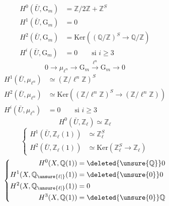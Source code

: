 \[
\begin{aligned}
H^0(\bar U,\mathrm{G}_m)&=\mathbb{Z}/2\mathbb{Z}+\mathbb{Z}^S\\
H^1(\bar U,\mathrm{G}_m)&=0\\
H^2(\bar U,\mathrm{G}_m)&=\mathrm{Ker}\left((\mathbb{Q}/\mathbb{Z})^S\longrightarrow\mathbb{Q}/\mathbb{Z}\right)\\
H^i(\bar U,\mathrm{G}_m)&=0\qquad\text{si }i\geq3
\end{aligned}
\]
\[
0\to\mu_{\ell^n}\to\mathrm{G}_m\xrightarrow{\ell^n}\mathrm{G}_m\to0
\]
\[
\begin{aligned}
H^1(\bar U,\mu_{\ell^n})&\simeq(\mathbb{Z}/\ell^n\mathbb{Z})^S\\
H^2(\bar U,\mu_{\ell^n})&\simeq\mathrm{Ker}\left((\mathbb{Z}/\ell^n\mathbb{Z})^S\longrightarrow(\mathbb{Z}/\ell^n\mathbb{Z})\right)\\
H^i(\bar U,\mu_{\ell^n})&=0\qquad\text{si }i\geq3
\end{aligned}
\]
\[
H^0(\bar U,\mathbb{Z}_\ell)\simeq\mathbb{Z}_\ell
\]
\[
\left\{\begin{aligned}
H^1(\bar U,\mathbb{Z}_\ell(1))&\simeq\mathbb{Z}_\ell^S\\
H^2(\bar U,\mathbb{Z}_\ell(1))&\simeq\mathrm{Ker}\left(\mathbb{Z}_\ell^S\longrightarrow\mathbb{Z}_\ell\right)
\end{aligned}\right.
\]
\[
\left\{\begin{aligned}
H^0(X,\mathbb{Q}(1))&=\deleted{\unsure{\mathbb{Q}}}0\\
H^1(X,\mathbb{Q}_{\unsure{\ell|\vphantom{\ell}}}(1))&=\deleted{\unsure{0}}0\\
H^2(X,\mathbb{Q}_{\unsure{\ell|\vphantom{\ell}}}(1))&=0\\
H^3(X,\mathbb{Q}(1))&=\deleted{\unsure{0}}\mathbb{Q}
\end{aligned}\right.
\]

